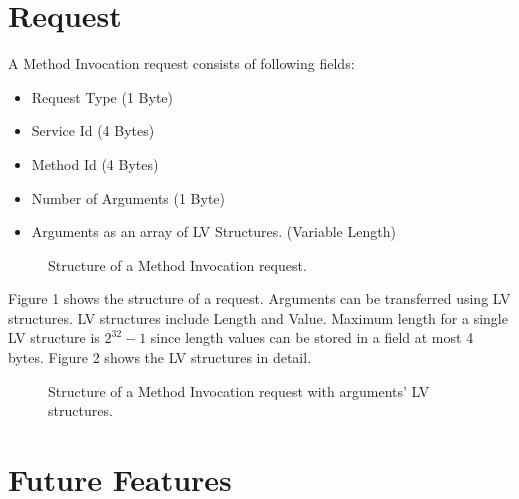 \documentclass[10pt,a4paper]{article}
\begin{document}
\section {Request}
A Method Invocation request consists of following fields:
\begin{itemize}
  \item Request Type (1 Byte)
  \item Service Id (4 Bytes)
  \item Method Id (4 Bytes)
  \item Number of Arguments (1 Byte)
  \item Arguments as an array of LV Structures. (Variable Length)
\end{itemize}

\begin{figure}[!ht]
  \caption{Structure of a Method Invocation request.}
  \centering
\end{figure}

Figure 1 shows the structure of a request. Arguments can be transferred using LV structures. LV structures include Length and Value. Maximum length for a single LV structure is $2^{32} - 1$ since length values can be stored in a field at most 4 bytes. Figure 2 shows the LV structures in detail.

\begin{figure}[!ht]
  \caption{Structure of a Method Invocation request with arguments' LV structures.}
  \centering
\end{figure}

\section {Future Features}
\end{document}
